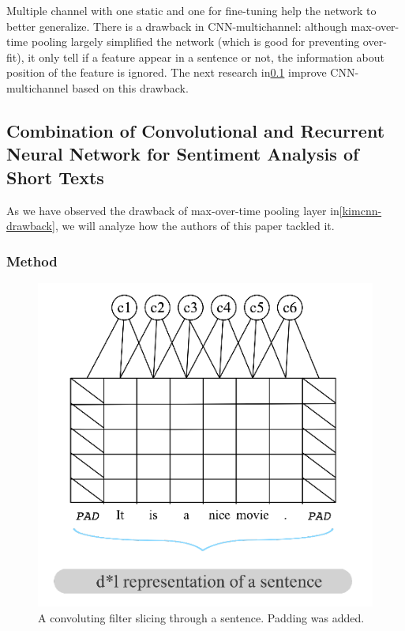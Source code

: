 Multiple channel with one static and one for fine-tuning help the network to better generalize.
There is a drawback in CNN-multichannel: although max-over-time pooling largely simplified the network (which is good for preventing over-fit), it only tell if a feature appear in a sentence or not, the information about position of the feature is ignored.\label{kim-drawback}
The next research in\ref{cnn-rnn}  improve CNN-multichannel based on this drawback.
 

\subsection{Combination of Convolutional and Recurrent Neural Network for Sentiment Analysis of Short Texts}\label{cnn-rnn}
As we have observed the drawback of max-over-time pooling layer in\ref{kimcnn-drawback}, we will analyze how the authors of this paper\cite{cnn-rnn} tackled it.

\subsubsection{Method}
\begin{figure}[H]
	\centering
\includegraphics[scale=0.5]{figure/conv-word}
	\caption{A convoluting filter slicing through a sentence. 
	Padding was added.}
	\label{fig:conv-word}
\end{figure}

